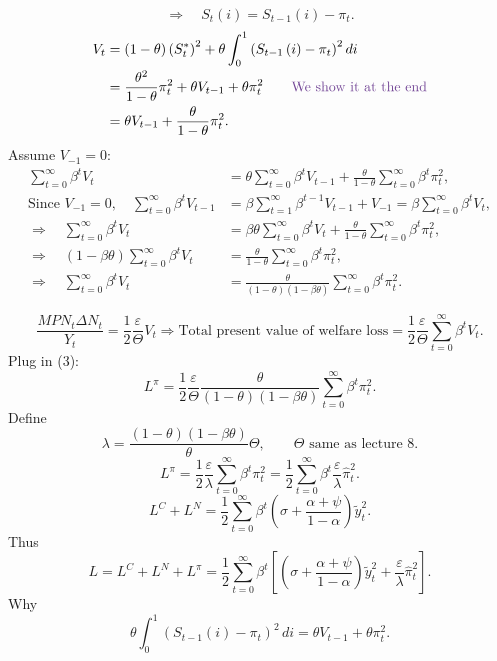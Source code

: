 \documentclass[11pt,fleqn]{article}
\newcommand{\purple}[1]{\textcolor{notePurple}{#1}}
\newcommand{\purp}[1]{\purple{#1}}
\begin{document}
\[
\Rightarrow\quad
S_t\left(i\right)=S_{t-1}\left(i\right)-\pi_t.
\]
\begin{align*}
V_t&=\left(1-\theta\right)\left(S_t^*\right)^2+\theta\int_0^1\left(S_{t-1}\left(i\right)-\pi_t\right)^2di\\[-1pt]
&=\frac{\theta^2}{1-\theta}\pi_t^2+\theta V_{t-1}+\theta\pi_t^2
\qquad\purp{\text{We show it at the end}}\\[-1pt]
&=\theta V_{t-1}+\frac{\theta}{1-\theta}\pi_t^2.
\end{align*}
Assume $V_{-1}=0$:
\begin{align*}
\sum_{t=0}^{\infty}\beta^tV_t
&=\theta\sum_{t=0}^{\infty}\beta^tV_{t-1}
+\frac{\theta}{1-\theta}\sum_{t=0}^{\infty}\beta^t\pi_t^2,\\[-1pt]
\text{Since }V_{-1}=0,
\quad \sum_{t=0}^{\infty}\beta^tV_{t-1}
&=\beta\sum_{t=1}^{\infty}\beta^{t-1}V_{t-1}+V_{-1}
=\beta\sum_{t=0}^{\infty}\beta^tV_t,\\[-1pt]
\Rightarrow\quad
\sum_{t=0}^{\infty}\beta^tV_t
&=\beta\theta\sum_{t=0}^{\infty}\beta^tV_t
+\frac{\theta}{1-\theta}\sum_{t=0}^{\infty}\beta^t\pi_t^2,\\[-1pt]
\Rightarrow\quad
\left(1-\beta\theta\right)\sum_{t=0}^{\infty}\beta^tV_t
&=\frac{\theta}{1-\theta}\sum_{t=0}^{\infty}\beta^t\pi_t^2,\\[-1pt]
\Rightarrow\quad
\sum_{t=0}^{\infty}\beta^tV_t
&=\frac{\theta}{\left(1-\theta\right)\left(1-\beta\theta\right)}\sum_{t=0}^{\infty}\beta^t\pi_t^2.\tag{3}
\end{align*}

\par\vspace{0.6em}

\[
\frac{MPN_t\Delta N_t}{Y_t}=\frac12\frac{\varepsilon}{\Theta}V_t
\Rightarrow
\text{Total present value of welfare loss}
=\frac12\frac{\varepsilon}{\Theta}\sum_{t=0}^{\infty}\beta^tV_t.
\]
Plug in (3):
\[
L^\pi=\frac12\frac{\varepsilon}{\Theta}
\frac{\theta}{\left(1-\theta\right)\left(1-\beta\theta\right)}
\sum_{t=0}^{\infty}\beta^t\pi_t^2.
\]
Define
\[
\lambda=\frac{\left(1-\theta\right)\left(1-\beta\theta\right)}{\theta}\Theta,
\qquad \Theta\text{ same as lecture 8.}
\]
\[
L^\pi=\frac12\frac{\varepsilon}{\lambda}\sum_{t=0}^{\infty}\beta^t\pi_t^2
=\frac12\sum_{t=0}^{\infty}\beta^t\frac{\varepsilon}{\lambda}\hat\pi_t^2.
\]
\[
L^C+L^N
=\frac12\sum_{t=0}^{\infty}\beta^t
\left(\sigma+\frac{\alpha+\psi}{1-\alpha}\right)\tilde y_t^2.
\]
Thus
\[
L=L^C+L^N+L^\pi
=\frac12\sum_{t=0}^{\infty}\beta^t
\left[\left(\sigma+\frac{\alpha+\psi}{1-\alpha}\right)\tilde y_t^2
+\frac{\varepsilon}{\lambda}\hat\pi_t^2\right].
\]
Why
\[
\theta\int_0^1\left(S_{t-1}\left(i\right)-\pi_t\right)^2\,di
=
\theta V_{t-1}+\theta\pi_t^2 .
\]
\end{document}
